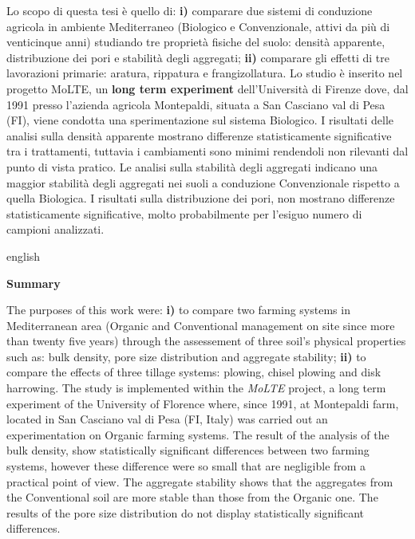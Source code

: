 \documentclass[fontsize=11pt,
captions=tableheading,
captions=figureheading,
a4paper,
headsepline=true,
footsepline=true,
open=right,
titlepage,
final]{scrbook}
\newenvironment{abstract}%
    {\cleardoublepage\null \vfill\begin{center}%
    \bfseries \abstractname \end{center} \footnotesize}%
{\vfill\null}
\newenvironment{engabstract}%
    {\cleardoublepage\null \vfill\begin{center}%
    \bfseries Summary  \end{center} \footnotesize}%
{\vfill\null}
\numberwithin{equation}{chapter} %
\begin{document}
\begin{samepage}
\begin{abstract}
  Lo scopo di questa tesi è quello di: \textbf{i)} comparare due
  sistemi di conduzione agricola in ambiente Mediterraneo (Biologico e
  Convenzionale, attivi da più di venticinque anni) studiando tre
  proprietà fisiche del suolo: densità apparente, distribuzione dei
  pori e stabilità degli aggregati; \textbf{ii)} comparare gli effetti
  di tre lavorazioni primarie: aratura, rippatura e
  frangizollatura. Lo studio è inserito nel progetto MoLTE, un
  \textbf{long term experiment} dell'Università di Firenze dove, dal
  1991 presso l'azienda agricola Montepaldi, situata a San Casciano
  val di Pesa (FI), viene condotta una sperimentazione sul sistema
  Biologico. I risultati delle analisi sulla densità apparente
  mostrano differenze statisticamente significative tra i trattamenti,
  tuttavia i cambiamenti sono minimi rendendoli non rilevanti dal
  punto di vista pratico.  Le analisi sulla stabilità degli aggregati
  indicano una maggior stabilità degli aggregati nei suoli a
  conduzione Convenzionale rispetto a quella Biologica. I risultati
  sulla distribuzione dei pori, non mostrano differenze
  statisticamente significative, molto probabilmente per l'esiguo
  numero di campioni analizzati.
\end{abstract}
\nopagebreak
\begin{otherlanguage*}{english}
  \begin{engabstract}
    The purposes of this work were: \textbf{i)} to compare two farming
    systems in Mediterranean area (Organic and Conventional management
    on site since more than twenty five years) through the assessement of three
    soil's physical properties such as: bulk density, pore size
    distribution and aggregate stability; \textbf{ii)} to compare the
    effects of three tillage systems: plowing, chisel plowing and disk
    harrowing. The study is implemented within the \emph{MoLTE}
    project, a long term experiment of the University of Florence
    where, since 1991, at Montepaldi farm, located in San Casciano val
    di Pesa (FI, Italy) was carried out an experimentation on Organic
    farming systems. The result of the analysis of the bulk density,
    show statistically significant differences between two farming
    systems, however these difference were so small that are
    negligible from a practical point of view. The aggregate stability
    shows that the aggregates from the Conventional soil are more
    stable than those from the Organic one. The results of the pore
    size distribution do not display statistically significant
    differences.
\end{engabstract}%
\end{otherlanguage*}
\end{samepage}
\end{document}
